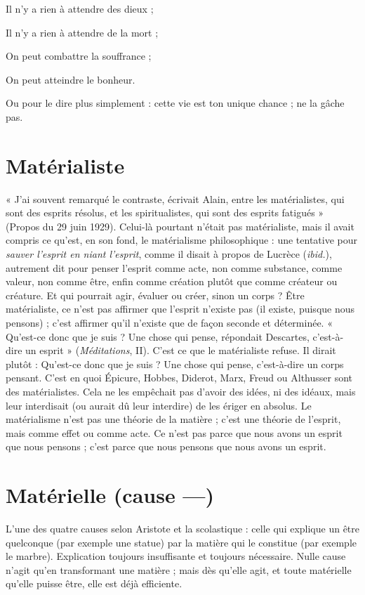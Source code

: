 Il n’y a rien à attendre des dieux ;

Il n’y a rien à attendre de la mort ;

On peut combattre la souffrance ;

On peut atteindre le bonheur.

Ou pour le dire plus simplement : cette vie est ton unique chance ; ne la
gâche pas.

\section{Matérialiste}
« J'ai souvent remarqué le contraste, écrivait Alain, entre
les matérialistes, qui sont des esprits résolus, et les spiritualistes,
qui sont des esprits fatigués » (Propos du 29 juin 1929). Celui-là pourtant
n'était pas matérialiste, mais il avait compris ce qu'est, en son fond, le
matérialisme philosophique : une tentative pour {\it sauver l'esprit en niant
l'esprit}, comme il disait à propos de Lucrèce ({\it ibid.}), autrement dit pour
penser l’esprit comme acte, non comme substance, comme valeur, non
comme être, enfin comme création plutôt que comme créateur ou créature.
Et qui pourrait agir, évaluer ou créer, sinon un corps ? Être matérialiste, ce
n’est pas affirmer que l'esprit n’existe pas (il existe, puisque nous pensons) ;
c’est affirmer qu’il n’existe que de façon seconde et déterminée. « Qu'est-ce
donc que je suis ? Une chose qui pense, répondait Descartes, c’est-à-dire un
esprit » ({\it Méditations}, II). C’est ce que le matérialiste refuse. Il dirait plutôt :
Qu'est-ce donc que je suis ? Une chose qui pense, c’est-à-dire un corps pensant.
C’est en quoi Épicure, Hobbes, Diderot, Marx, Freud ou Althusser sont
des matérialistes. Cela ne les empêchait pas d’avoir des idées, ni des idéaux,
mais leur interdisait (ou aurait dû leur interdire) de les ériger en absolus. Le
matérialisme n’est pas une théorie de la matière ; c’est une théorie de l'esprit,
mais comme effet ou comme acte. Ce n’est pas parce que nous avons un
esprit que nous pensons ; c’est parce que nous pensons que nous avons un
esprit.

\section{Matérielle (cause —)}
L'une des quatre causes selon Aristote et la scolastique :
celle qui explique un être quelconque
(par exemple une statue) par la matière qui le constitue (par exemple le
marbre). Explication toujours insuffisante et toujours nécessaire. Nulle cause
n’agit qu’en transformant une matière ; mais dès qu’elle agit, et toute matérielle
qu’elle puisse être, elle est déjà efficiente.

